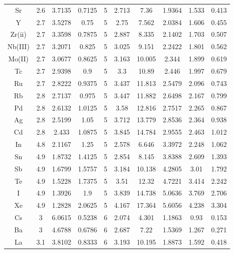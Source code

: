 \documentclass[journal]{IEEEtran}
\begin{document}
{\begin{longtable}{|c|c|c|c|c|c|c|c|c|c|}
		Sr       & 2.6 & 3.7135 & 0.7125 & 5 & 2.713  & 7.36    & 1.9364  & 1.533  & 0.413   \\
		Y        & 2.7 & 3.5278 & 0.75   & 5 & 2.75   & 7.562   & 2.0384  & 1.606  & 0.455   \\
		Zr(ii)   & 2.7 & 3.3598 & 0.7875 & 5 & 2.887  & 8.335   & 2.1402  & 1.703  & 0.507   \\
		Nb(III)  & 2.7 & 3.2071 & 0.825  & 5 & 3.025  & 9.151   & 2.2422  & 1.801  & 0.562   \\
		Mo(II)   & 2.7 & 3.0677 & 0.8625 & 5 & 3.163  & 10.005  & 2.344   & 1.899  & 0.619   \\
		Tc       & 2.7 & 2.9398 & 0.9    & 5 & 3.3    & 10.89   & 2.446   & 1.997  & 0.679   \\
		Ru       & 2.7 & 2.8222 & 0.9375 & 5 & 3.437  & 11.813  & 2.5479  & 2.096  & 0.743   \\
		Rb       & 2.8 & 2.7137 & 0.975  & 5 & 3.447  & 11.882  & 2.6498  & 2.167  & 0.799   \\
		Pd       & 2.8 & 2.6132 & 1.0125 & 5 & 3.58   & 12.816  & 2.7517  & 2.265  & 0.867   \\
		Ag       & 2.8 & 2.5199 & 1.05   & 5 & 3.712  & 13.779  & 2.8536  & 2.364  & 0.938   \\
		Cd       & 2.8 & 2.433  & 1.0875 & 5 & 3.845  & 14.784  & 2.9555  & 2.463  & 1.012   \\
		In       & 4.8 & 2.1167 & 1.25   & 5 & 2.578  & 6.646   & 3.3972  & 2.248  & 1.062   \\
		Sn       & 4.9 & 1.8732 & 1.4125 & 5 & 2.854  & 8.145   & 3.8388  & 2.609  & 1.393   \\
		Sb       & 4.9 & 1.6799 & 1.5757 & 5 & 3.184  & 10.138  & 4.2805  & 3.01   & 1.792   \\
		Te       & 4.9 & 1.5228 & 1.7375 & 5 & 3.51   & 12.32   & 4.7221  & 3.414  & 2.242   \\
		I        & 4.9 & 1.3926 & 1.9    & 5 & 3.839  & 14.738  & 5.0636  & 3.769  & 2.706   \\
		Xe       & 4.9 & 1.2828 & 2.0625 & 5 & 4.167  & 17.364  & 5.6056  & 4.238  & 3.304   \\
		Cs       & 3   & 6.0615 & 0.5238 & 6 & 2.074  & 4.301   & 1.1863  & 0.93   & 0.153   \\
		Ba       & 3   & 4.6788 & 0.6786 & 6 & 2.687  & 7.22    & 1.5369  & 1.267  & 0.271   \\
		La       & 3.1 & 3.8102 & 0.8333 & 6 & 3.193  & 10.195  & 1.8873  & 1.592  & 0.418   \\

\end{longtable}}
\end{document}
